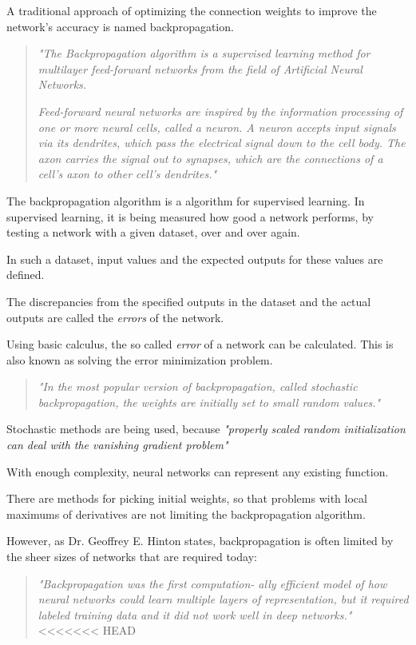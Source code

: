 A traditional approach of optimizing the connection weights to improve the network's accuracy is named backpropagation.

\begin{quote}
\emph{"The Backpropagation algorithm is a supervised learning method for multilayer feed-forward networks from the field of Artificial Neural Networks. }

\emph{Feed-forward neural networks are inspired by the information processing of one or more neural cells, called a neuron. A neuron accepts input signals via its dendrites, which pass the electrical signal down to the cell body. The axon carries the signal out to synapses, which are the connections of a cell’s axon to other cell’s dendrites."} \cite{backprop_from_scratch} 
\end{quote}

The backpropagation algorithm is a algorithm for supervised learning. In supervised learning, it is being measured how good a network performs, by testing a network with a given dataset, over and over again. 

In such a dataset, input values and the expected outputs for these values are defined.

The discrepancies from the specified outputs in the dataset and the actual outputs are called the \emph{errors} of the network.\cite{Learning2014}

Using basic calculus, the so called \emph{error} of a network can be calculated. This is also known as solving the error minimization problem. \cite{Sathyanarayana2014}

\begin{quote}
\emph{"In the most popular version of backpropagation, called stochastic backpropagation, the weights are initially set to small random values."}\cite{Sathyanarayana2014}	
\end{quote}

Stochastic methods are being used, because \emph{"properly scaled random initialization can deal with the vanishing gradient problem"}\cite{Kraehenbuehl2016}

With enough complexity, neural networks can represent any existing function. \cite{Nielsen2016}

There are methods for picking initial weights, so that problems with local maximums of derivatives are not limiting the backpropagation algorithm.\cite{Nguyen1990}

However, as Dr. Geoffrey E. Hinton states, backpropagation is often limited by the sheer sizes of networks that are required today:

\begin{quote}
\emph{"Backpropagation was the first computation-
	ally efficient model of how neural networks could learn
	multiple layers of representation, but it required labeled
	training data and it did not work well in deep networks."}
<<<<<<< HEAD
\cite{Hinton2007}
\end{quote}

\cite{Rojas1996}
